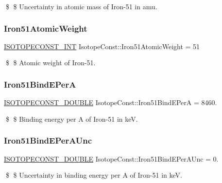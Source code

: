 \$ \$ Uncertainty in atomic mass of Iron-\/51 in amu. \mbox{\label{group___isotope_const-_iron-_fe51_ga57603933424ac7afcfd9695bea621d9a}} 
\subsubsection{\texorpdfstring{Iron51\+Atomic\+Weight}{Iron51AtomicWeight}}
{\footnotesize\ttfamily \mbox{\hyperlink{group___isotope_const-_macros_ga5f18360b3e99483a35c32d789e62621c}{I\+S\+O\+T\+O\+P\+E\+C\+O\+N\+S\+T\+\_\+\+I\+NT}} Isotope\+Const\+::\+Iron51\+Atomic\+Weight = 51}

\$ \$ Atomic weight of Iron-\/51. \mbox{\label{group___isotope_const-_iron-_fe51_gae1bcda9ffb364f5f242c45fe695ba930}} 
\subsubsection{\texorpdfstring{Iron51\+Bind\+E\+PerA}{Iron51BindEPerA}}
{\footnotesize\ttfamily \mbox{\hyperlink{group___isotope_const-_macros_ga8f45a7272ce02c0b4c65c44636ed719a}{I\+S\+O\+T\+O\+P\+E\+C\+O\+N\+S\+T\+\_\+\+D\+O\+U\+B\+LE}} Isotope\+Const\+::\+Iron51\+Bind\+E\+PerA = 8460.}

\$ \$ Binding energy per A of Iron-\/51 in keV. \mbox{\label{group___isotope_const-_iron-_fe51_ga92e9f42d5102b209d778c50949175f06}} 
\subsubsection{\texorpdfstring{Iron51\+Bind\+E\+Per\+A\+Unc}{Iron51BindEPerAUnc}}
{\footnotesize\ttfamily \mbox{\hyperlink{group___isotope_const-_macros_ga8f45a7272ce02c0b4c65c44636ed719a}{I\+S\+O\+T\+O\+P\+E\+C\+O\+N\+S\+T\+\_\+\+D\+O\+U\+B\+LE}} Isotope\+Const\+::\+Iron51\+Bind\+E\+Per\+A\+Unc = 0.}

\$ \$ Uncertainty in binding energy per A of Iron-\/51 in keV. \mbox{\label{group___isotope_const-_iron-_fe51_ga472a1dbab2616edfaffcc8e60bfc6000}} 
